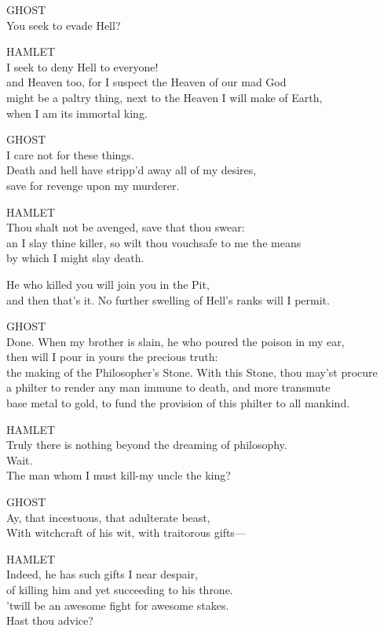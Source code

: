 \bigskip
\noindent{}GHOST\\
You seek to evade Hell?

\bigskip
\noindent{}HAMLET\\
I seek to deny Hell to everyone!\\
and Heaven too, for I suspect the Heaven of our mad God\\
might be a paltry thing, next to the Heaven I will make of Earth,\\
when I am its immortal king.

\bigskip
\noindent{}GHOST\\
I care not for these things.\\
Death and hell have stripp'd away all of my desires,\\
save for revenge upon my murderer.

\bigskip
\noindent{}HAMLET\\
Thou shalt not be avenged, save that thou swear:\\
an I slay thine killer, so wilt thou vouchsafe to me the means\\
by which I might slay death.

\bigskip
\noindent{}He who killed you will join you in the Pit,\\
and then that's it. No further swelling of Hell's ranks will I permit.

\bigskip
\noindent{}GHOST\\
Done. When my brother is slain, he who poured the poison in my ear,\\
then will I pour in yours the precious truth:\\
the making of the Philosopher's Stone. With this Stone, thou may'st procure\\
a philter to render any man immune to death, and more transmute\\
base metal to gold, to fund the provision of this philter to all mankind.

\bigskip
\noindent{}HAMLET\\
Truly there is nothing beyond the dreaming of philosophy.\\
Wait.\\
The man whom I must kill-my uncle the king?

\bigskip
\noindent{}GHOST\\
Ay, that incestuous, that adulterate beast,\\
With witchcraft of his wit, with traitorous gifts---

\bigskip
\noindent{}HAMLET\\
Indeed, he has such gifts I near despair,\\
of killing him and yet succeeding to his throne.\\
'twill be an awesome fight for awesome stakes.\\
Hast thou advice?

